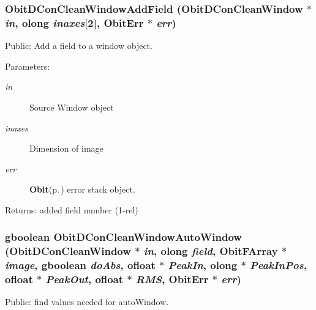 \subsubsection{ Obit\-DCon\-Clean\-Window\-Add\-Field ({\bf Obit\-DCon\-Clean\-Window} $\ast$ {\em in}, {\bf olong} {\em inaxes}[2], {\bf Obit\-Err} $\ast$ {\em err})}\label{ObitDConCleanWindow_8h_a47}


Public: Add a field to a window object. 

\begin{Desc}
\item[Parameters:]
\begin{description}
\item[{\em in}]Source Window object \item[{\em inaxes}]Dimension of image \item[{\em err}]{\bf Obit}{\rm (p.\,\pageref{structObit})} error stack object. \end{description}
\end{Desc}
\begin{Desc}
\item[Returns:]added field number (1-rel) \end{Desc}
\subsubsection{\setlength{\rightskip}{0pt plus 5cm}gboolean Obit\-DCon\-Clean\-Window\-Auto\-Window ({\bf Obit\-DCon\-Clean\-Window} $\ast$ {\em in}, {\bf olong} {\em field}, {\bf Obit\-FArray} $\ast$ {\em image}, gboolean {\em do\-Abs}, {\bf ofloat} $\ast$ {\em Peak\-In}, {\bf olong} $\ast$ {\em Peak\-In\-Pos}, {\bf ofloat} $\ast$ {\em Peak\-Out}, {\bf ofloat} $\ast$ {\em RMS}, {\bf Obit\-Err} $\ast$ {\em err})}\label{ObitDConCleanWindow_8h_a45}


Public: find values needed for auto\-Window. 

